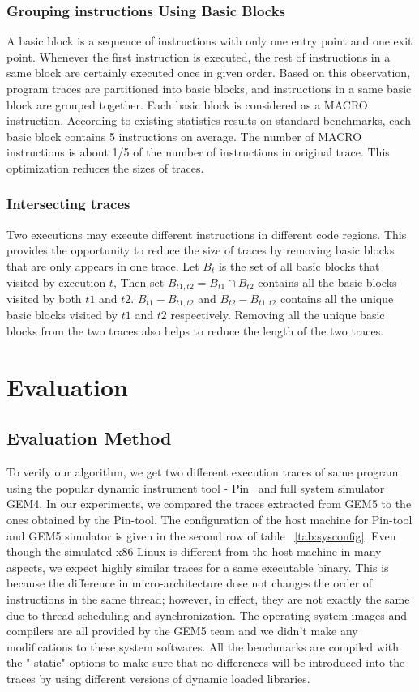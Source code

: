 \documentclass[10pt,journal,cspaper,compsoc]{IEEEtran}
\begin{document}
\subsubsection{Grouping instructions Using Basic Blocks}
A basic block is a sequence of instructions with only one entry
point and one exit point. Whenever the first instruction is
executed, the rest of instructions in a same block are certainly
executed once in given order. Based on this observation, program
traces are partitioned into basic blocks, and instructions in a same
basic block are grouped together. Each basic block is considered as
a MACRO instruction. According to existing statistics results on
standard benchmarks, each basic block contains 5 instructions on
average. The number of MACRO instructions is about 1/5 of the number
of instructions in original trace. This optimization reduces the
sizes of traces.

\subsubsection{Intersecting traces}
Two executions may execute different instructions in different code
regions. This provides the opportunity to reduce the size of traces
by removing basic blocks that are only appears in one trace. Let
$B_t$ is the set of all basic blocks that visited by execution $t$,
Then set $B_{t1,t2} = B_{t1} \cap B_{t2}$ contains all the basic
blocks visited by both $t1$ and $t2$. $B_{t1} - B_{t1,t2}$ and
$B_{t2} - B_{t1,t2}$ contains all the unique basic blocks visited by
$t1$ and $t2$ respectively. Removing all the unique basic blocks
from the two traces also helps to reduce the length of the two
traces.


\section{Evaluation}
\subsection{Evaluation Method}
\label{sec:eval}

To verify our algorithm, we get two different execution traces of
same program using the popular dynamic instrument tool -
Pin~\cite{pin10} and full system simulator GEM4. In our experiments,
we compared the traces extracted from GEM5 to the ones obtained by
the Pin-tool. The configuration of the host machine for Pin-tool and
GEM5 simulator is given in the second row of table
~\ref{tab:sysconfig}. Even though the simulated x86-Linux is
different from the host machine in many aspects, we expect highly
similar traces for a same executable binary. This is because the
difference in micro-architecture dose not changes the order of
instructions in the same thread; however, in effect, they are not
exactly the same due to thread scheduling and synchronization. The
operating system images and compilers are all provided by the GEM5
team and we didn't make any modifications to these system softwares.
All the benchmarks are compiled with the "-static" options to make
sure that no differences will be introduced into the traces by using
different versions of dynamic loaded libraries.
\end{document}
